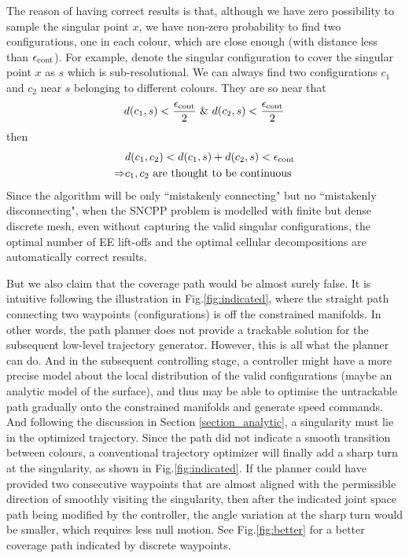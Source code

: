 \documentclass[Afour,sageh,times]{sagej}
\begin{document}
The reason of having correct results is that, although we have zero possibility to sample the singular point $x$, we have non-zero probability to find two configurations, one in each colour, which are close enough (with distance less than $\epsilon_{\rm cont}$). 
For example, denote the singular configuration to cover the singular point $x$ as $s$ which is sub-resolutional. We can always find two configurations $c_1$ and $c_2$ near $s$ belonging to different colours. They are so near that 
\begin{equation}\label{equ_near}
d(c_1, s) <\frac{\epsilon_{\rm cont}}{2}\ \&\ d(c_2, s) < \frac{\epsilon_{\rm cont}}{2}
\end{equation}
then 
\begin{equation}
\begin{aligned}
&d(c_1, c_2) < d(c_1, s) + d(c_2, s)<\epsilon_{\rm cont}\\
\Rightarrow &c_1, c_2 \mbox{ are thought to be continuous} 
\end{aligned}
\end{equation}
Since the algorithm will be only ``mistakenly connecting" but no ``mistakenly disconnecting", when the SNCPP problem is modelled with finite but dense discrete mesh, even without capturing the valid singular configurations, the optimal number of EE lift-offs and the optimal cellular decompositions are automatically correct results. 

But we also claim that the coverage path would be almost surely false. It is intuitive following the illustration in Fig.\ref{fig:indicated}, where the straight path connecting two waypoints (configurations) is off the constrained manifolds. In other words, the path planner does not provide a trackable solution for the subsequent low-level trajectory generator. 
However, this is all what the planner can do. 
And in the subsequent controlling stage, a controller might have a more precise model about the local distribution of the valid configurations (maybe an analytic model of the surface), and thus may be able to optimise the untrackable path gradually onto the constrained manifolds and generate speed commands. And following the discussion in Section \ref{section_analytic}, a singularity must lie in the optimized trajectory. 
Since the path did not indicate a smooth transition between colours, a conventional trajectory optimizer will finally add a sharp turn at the singularity, as shown in Fig.\ref{fig:indicated}. 
If the planner could have provided two consecutive waypoints that are almost aligned with the permissible direction of smoothly visiting the singularity, then after the indicated joint space path being modified by the controller, the angle variation at the sharp turn would be smaller, which requires less null motion. See Fig.\ref{fig:better} for a better coverage path indicated by discrete waypoints. 
\end{document}
